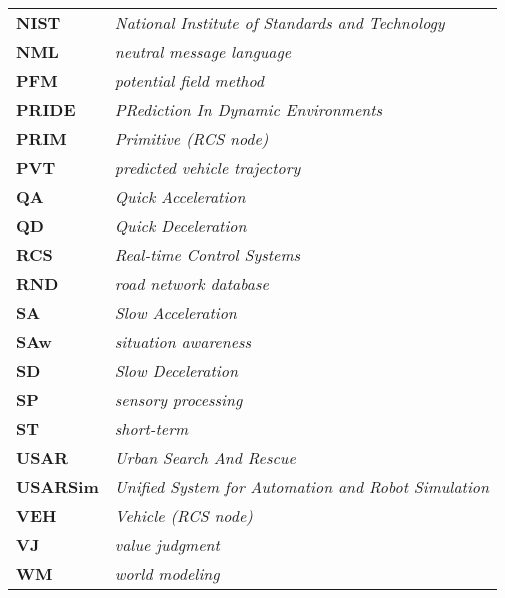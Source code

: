 \begin{table}[h!t!]
\begin{center}
\begin{small}
\begin{tabular}[t]{ll}
\textbf{\color{Black}NIST} & \textit{\color{DefColor}National Institute of Standards and Technology} \\
\textbf{\color{Black}NML} & \textit{\color{DefColor}neutral message language} \\
\textbf{\color{Black}PFM} & \textit{\color{DefColor}potential field method}\\
\textbf{\color{Black}PRIDE} & \textit{\color{DefColor}PRediction In Dynamic Environments}\\
\textbf{\color{Black}PRIM} & \textit{\color{DefColor}Primitive (RCS node)} \\
\textbf{\color{Black}PVT} & \textit{\color{DefColor}predicted vehicle trajectory}\\
\textbf{\color{Black}QA} & \textit{\color{DefColor}Quick Acceleration}\\
\textbf{\color{Black}QD} & \textit{\color{DefColor}Quick Deceleration}\\
\textbf{\color{Black}RCS} & \textit{\color{DefColor}Real-time Control Systems}\\
\textbf{\color{Black}RND} & \textit{\color{DefColor}road network database}\\
\textbf{\color{Black}SA} & \textit{\color{DefColor}Slow Acceleration}\\
\textbf{\color{Black}SAw} & \textit{\color{DefColor}situation awareness}\\
\textbf{\color{Black}SD} & \textit{\color{DefColor}Slow Deceleration}\\
\textbf{\color{Black}SP} & \textit{\color{DefColor}sensory processing}\\
\textbf{\color{Black}ST} & \textit{\color{DefColor}short-term} \\
\textbf{\color{Black}USAR} & \textit{\color{DefColor}Urban Search And Rescue} \\
\textbf{\color{Black}USARSim} & \textit{\color{DefColor}Unified System for Automation and Robot Simulation} \\
\textbf{\color{Black}VEH} & \textit{\color{DefColor}Vehicle (RCS node)} \\
\textbf{\color{Black}VJ} & \textit{\color{DefColor}value judgment}\\
\textbf{\color{Black}WM} & \textit{\color{DefColor}world modeling}\\
\end{tabular}
\end{small}
\end{center}
\end{table}
